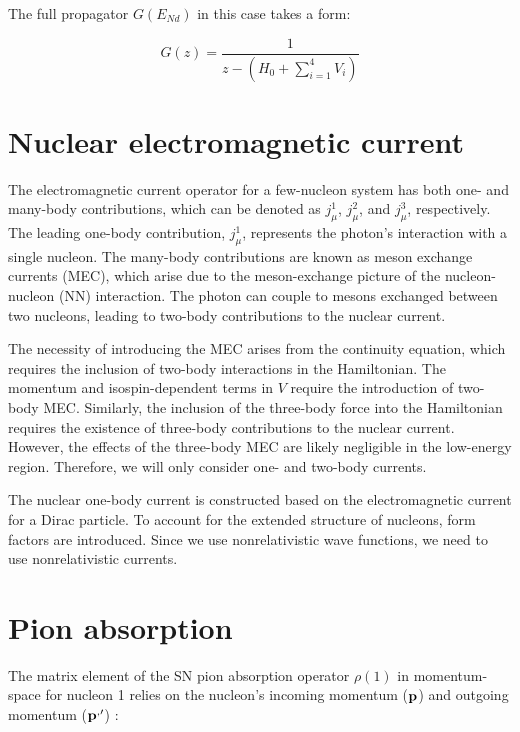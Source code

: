     The full propagator $G(E_{Nd})$ in this case takes a form:
    
    \begin{equation}
        G(z)= \frac{1}{z - (H_0 + \sum_{i=1}^4V_i)}
    \end{equation}


    \section{Nuclear electromagnetic current}
    
    The electromagnetic current operator for a few-nucleon system has both one- and many-body contributions, which
    can be denoted as $j_\mu^1$, $j_\mu^2$, and $j_\mu^3$, respectively. The leading one-body contribution,
    $j_\mu^1$, represents the photon's interaction with a single nucleon. The many-body contributions are known as
    meson exchange currents (MEC), which arise due to the meson-exchange picture of the nucleon-nucleon (NN)
    interaction. The photon can couple to mesons exchanged between two nucleons, leading to two-body contributions to
    the nuclear current.

    The necessity of introducing the MEC arises from the continuity equation, which requires the inclusion of
    two-body interactions in the Hamiltonian. The momentum and isospin-dependent terms in $V$ require the
    introduction of two-body MEC. Similarly, the inclusion of the three-body force into the Hamiltonian requires the
    existence of three-body contributions to the nuclear current. However, the effects of the three-body MEC are
    likely negligible in the low-energy region. Therefore, we will only consider one- and two-body currents.

    The nuclear one-body current is constructed based on the electromagnetic current for a Dirac particle. To account
    for the extended structure of nucleons, form factors are introduced. Since we use nonrelativistic wave functions,
    we need to use nonrelativistic currents.


    \section{Pion absorption}

    The matrix element of the SN pion absorption operator $\rho(1)$ in momentum-space for nucleon 1 relies on the
    nucleon's incoming momentum (${\bf p}$) and outgoing momentum (${\bf p}^{, \prime}$) \cite{BERNARD_1995}:

